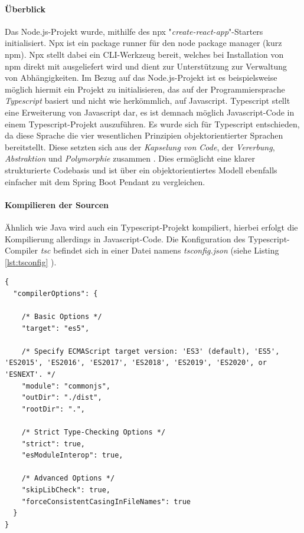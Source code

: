 \paragraph{Überblick}
Das Node.js-Projekt wurde, mithilfe des npx "\emph{create-react-app}"-Starters initialisiert. Npx ist ein package runner für den node package manager (kurz npm). Npx stellt dabei ein CLI-Werkzeug bereit, welches bei Installation von npm direkt mit ausgeliefert wird und dient zur Unterstützung zur Verwaltung von Abhängigkeiten. Im Bezug auf das Node.js-Projekt ist es beispielsweise möglich hiermit ein Projekt zu initialisieren, das auf der Programmiersprache \emph{Typescript} basiert und nicht wie herkömmlich, auf Javascript. Typescript stellt eine Erweiterung von Javascript dar, es ist demnach möglich Javascript-Code in einem Typescript-Projekt auszuführen. Es wurde sich für Typescript entschieden, da diese Sprache die vier wesentlichen Prinzipien objektorientierter Sprachen bereitstellt. Diese setzten sich aus der \emph{Kapselung von Code}, der \emph{Vererbung}, \emph{Abstraktion} und \emph{Polymorphie} zusammen \cite{typescript-oop}. Dies ermöglicht eine klarer strukturierte Codebasis und ist über ein objektorientiertes Modell ebenfalls einfacher mit dem Spring Boot Pendant zu vergleichen.

\paragraph{Kompilieren der Sourcen}
Ähnlich wie Java wird auch ein Typescript-Projekt kompiliert, hierbei erfolgt die Kompilierung allerdings in Javascript-Code. Die Konfiguration des Typescript-Compiler \emph{tsc} befindet sich in einer Datei namens \emph{tsconfig.json} (siehe Listing \ref{lst:tsconfig} ).

\begin{minipage}{\linewidth}
\begin{lstlisting}[style=javaStyle,caption={tsconfig.json},label=lst:tsconfig]
  {
  "compilerOptions": {

    /* Basic Options */
    "target": "es5",

    /* Specify ECMAScript target version: 'ES3' (default), 'ES5', 'ES2015', 'ES2016', 'ES2017', 'ES2018', 'ES2019', 'ES2020', or 'ESNEXT'. */
    "module": "commonjs",
    "outDir": "./dist",
    "rootDir": ".",

    /* Strict Type-Checking Options */
    "strict": true,
    "esModuleInterop": true,

    /* Advanced Options */
    "skipLibCheck": true,
    "forceConsistentCasingInFileNames": true
  }
}

\end{lstlisting}
\end{minipage}

